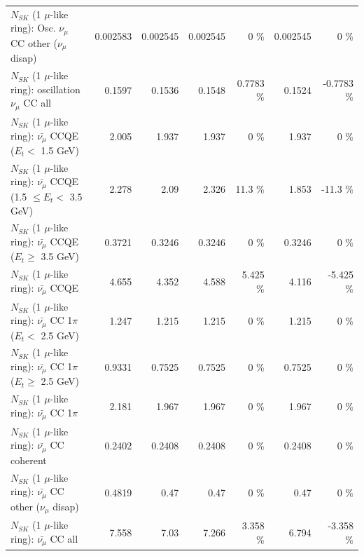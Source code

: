 \begin{table}
\begin{tabular}{| l | r | r | r  r | r  r |}
         $N_{SK}$ (1 $\mu$-like ring): Osc. $\nu_\mu$ CC other ($\nu_\mu$ disap) &        0.002583 &        0.002545 &        0.002545 &        0 \%  &        0.002545 &        0 \%  \\ 
                      $N_{SK}$ (1 $\mu$-like ring): oscillation $\nu_\mu$ CC all &          0.1597 &          0.1536 &          0.1548 &   0.7783 \%  &          0.1524 &  -0.7783 \%  \\ 
\hline
\hline
          $N_{SK}$ (1 $\mu$-like ring): $\bar{\nu_\mu}$ CCQE ($E_{t} <$ 1.5 GeV) &           2.005 &           1.937 &           1.937 &        0 \%  &           1.937 &        0 \%  \\ 
 $N_{SK}$ (1 $\mu$-like ring): $\bar{\nu_\mu}$ CCQE (1.5 $\leq E_{t} <$ 3.5 GeV) &           2.278 &            2.09 &           2.326 &     11.3 \%  &           1.853 &    -11.3 \%  \\ 
       $N_{SK}$ (1 $\mu$-like ring): $\bar{\nu_\mu}$ CCQE ($E_{t} \geq$ 3.5 GeV) &          0.3721 &          0.3246 &          0.3246 &        0 \%  &          0.3246 &        0 \%  \\ 
\hline
                              $N_{SK}$ (1 $\mu$-like ring): $\bar{\nu_\mu}$ CCQE &           4.655 &           4.352 &           4.588 &    5.425 \%  &           4.116 &   -5.425 \%  \\ 
\hline
     $N_{SK}$ (1 $\mu$-like ring): $\bar{\nu_\mu}$ CC 1$\pi$ ($E_{t} <$ 2.5 GeV) &           1.247 &           1.215 &           1.215 &        0 \%  &           1.215 &        0 \%  \\ 
  $N_{SK}$ (1 $\mu$-like ring): $\bar{\nu_\mu}$ CC 1$\pi$ ($E_{t} \geq$ 2.5 GeV) &          0.9331 &          0.7525 &          0.7525 &        0 \%  &          0.7525 &        0 \%  \\ 
\hline
                         $N_{SK}$ (1 $\mu$-like ring): $\bar{\nu_\mu}$ CC 1$\pi$ &           2.181 &           1.967 &           1.967 &        0 \%  &           1.967 &        0 \%  \\ 
                       $N_{SK}$ (1 $\mu$-like ring): $\bar{\nu_\mu}$ CC coherent &          0.2402 &          0.2408 &          0.2408 &        0 \%  &          0.2408 &        0 \%  \\ 
        $N_{SK}$ (1 $\mu$-like ring): $\bar{\nu_\mu}$ CC other ($\nu_\mu$ disap) &          0.4819 &            0.47 &            0.47 &        0 \%  &            0.47 &        0 \%  \\ 
                          $N_{SK}$ (1 $\mu$-like ring): $\bar{\nu_{\mu}}$ CC all &           7.558 &            7.03 &           7.266 &    3.358 \%  &           6.794 &   -3.358 \%  \\ 

\end{tabular}
\end{table}
